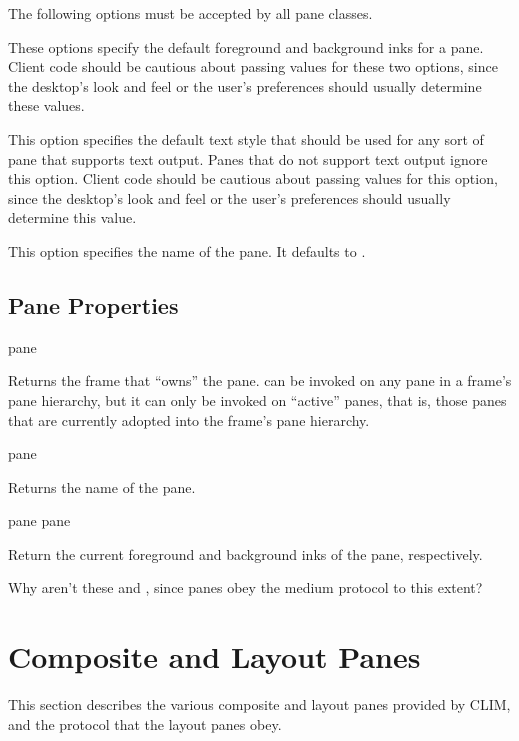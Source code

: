The following options must be accepted by all pane classes.


These options specify the default foreground and background inks for a pane.
Client code should be cautious about passing values for these two options, since
the desktop's look and feel or the user's preferences should usually determine
these values.


This option specifies the default text style that should be used for any sort of
pane that supports text output.  Panes that do not support text output ignore
this option.  Client code should be cautious about passing values for this
option, since the desktop's look and feel or the user's preferences should
usually determine this value.


This option specifies the name of the pane.  It defaults to .


\subsection {Pane Properties}

 {pane}

Returns the frame that ``owns'' the pane.   can be invoked on any
pane in a frame's pane hierarchy, but it can only be invoked on ``active''
panes, that is, those panes that are currently adopted into the frame's pane
hierarchy.

 {pane}

Returns the name of the pane.

 {pane}
 {pane}

Return the current foreground and background inks of the pane, respectively.

 {Why aren't these  and
, since panes obey the medium protocol to this extent?}


\section {Composite and Layout Panes}

This section describes the various composite and layout panes provided by CLIM,
and the protocol that the layout panes obey.

